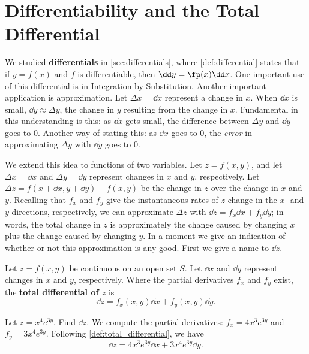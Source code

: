 \section{Differentiability and the Total Differential}\label{sec:total_differential}

We studied \textbf{differentials} in \autoref{sec:differentials}, where \autoref{def:differential}  states that if $y=f(x)$ and $f$ is differentiable, then $\dd y=\fp(x)\dd x$. One important use of this differential is in Integration by Substitution. Another important application is approximation. Let $\Delta x = \dd x$ represent a change in $x$. When $\dd x$ is small, $\dd y\approx \Delta y$, the change in $y$ resulting from the change in $x$. Fundamental in this understanding is this: as $\dd x$ gets small, the difference between $\Delta y$ and $\dd y$ goes to 0. Another way of stating this: as $\dd x$ goes to 0, the \emph{error} in approximating $\Delta y$ with $\dd y$ goes to 0.

We extend this idea to functions of two variables. Let $z=f(x,y)$, and let $\Delta x = \dd x$ and $\Delta y=\dd y$ represent changes in $x$ and $y$, respectively. Let $\Delta z = f(x+\dd x,y+\dd y) - f(x,y)$ be the change in $z$ over the change in $x$ and $y$. Recalling that $f_x$ and $f_y$ give the instantaneous rates of $z$-change in the $x$- and $y$-directions, respectively, we can approximate $\Delta z$ with $\dd z = f_x\dd x+f_y\dd y$; in words, the total change in $z$ is approximately the change caused by changing $x$ plus the change caused by changing $y$. In a moment we give an indication of whether or not this approximation is any good. First we give a name to $\dd z$.

\begin{definition}\label{def:total_differential}
Let $z=f(x,y)$ be continuous on an open set $S$. Let $\dd x$ and $\dd y$ represent changes in $x$ and $y$, respectively. Where the partial derivatives $f_x$ and $f_y$ exist, the \textbf{total differential of $z$} is 
\[\dd z = f_x(x,y)\dd x + f_y(x,y)\dd y.\]
\end{definition}


\begin{example}\label{ex_total_diff_10}
Let $z = x^4e^{3y}$. Find $\dd z$.
\solution
We compute the partial derivatives: $f_x = 4x^3e^{3y}$ and $f_y = 3x^4e^{3y}$. Following \autoref{def:total_differential}, we have
\[\dd z = 4x^3e^{3y}\dd x+3x^4e^{3y}\dd y.\]
\end{example}

